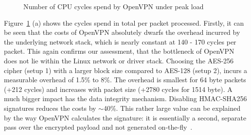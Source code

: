 \documentclass[IN,11pt,twoside,openright,master,english]{tumthesis}
\begin{document}
\begin{figure}[h!]
	\centering
	

	
	\caption{Number of CPU cycles spend by OpenVPN under peak load}
	\label{fig:openvpn-cycle-analysis}
\end{figure}

Figure~\ref{fig:openvpn-cycle-analysis} (a) shows the cycles spend in total per packet processed. 
Firstly, it can be seen that the costs of OpenVPN absolutely dwarfs the overhead incurred by the underlying network stack, which is nearly constant at 140 - 170 cycles per packet. This again confirms our assessment, that the bottleneck of OpenVPN does not lie within the Linux network or driver stack.
Choosing the AES-256 cipher (setup 1) with a larger block size compared to AES-128 (setup 2), incurs a measurable overhead of 1.5\% to 8\%. The overhead is smallest for 64 byte packets (+212 cycles) and increases with packet size (+2780 cycles for 1514 byte).
A much bigger impact has the data integrity mechanism. Disabling HMAC-SHA256 signatures reduces the costs by $\sim$40\%. This rather large value can be explained by the way OpenVPN calculates the signature: it is essentially a second, separate pass over the encrypted payload and not generated on-the-fly~\cite{openvpn-encrypt-v1}.
\end{document}
